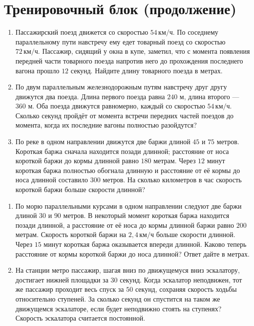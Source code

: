 \documentclass[a4paper,12pt]{article}
\newcommand{\topic}[1]{\par\medskip\noindent{\color{darkaccent}\textbf{#1}}\par\smallskip}
\newcommand{\unit}[1]{\,\text{#1}}
\begin{document}
\section*{Тренировочный блок (продолжение)}
\topic{Уровень выше среднего}
\begin{enumerate}[resume]
\item Пассажирский поезд движется со скоростью $54\unit{км/ч}$. По соседнему параллельному пути навстречу ему едет товарный поезд со скоростью $72\unit{км/ч}$. Пассажир, сидящий у окна в купе, заметил, что с момента появления передней части товарного поезда напротив него до прохождения последнего вагона прошло $12$ секунд. Найдите длину товарного поезда в метрах.
\item По двум параллельным железнодорожным путям навстречу друг другу движутся два поезда. Длина первого поезда равна $240$ м, длина второго --- $360$ м. Оба поезда движутся равномерно, каждый со скоростью $54\unit{км/ч}$. Сколько секунд пройдёт от момента встречи передних частей поездов до момента, когда их последние вагоны полностью разойдутся?
\item По реке в одном направлении движутся две баржи длиной $45$ и $75$ метров. Короткая баржа сначала находится позади длинной; расстояние от носа короткой баржи до кормы длинной равно $180$ метрам. Через $12$ минут короткая баржа полностью обогнала длинную и расстояние от её кормы до носа длинной составило $300$ метров. На сколько километров в час скорость короткой баржи больше скорости длинной?
\end{enumerate}
\topic{Сложный уровень}
\begin{enumerate}[resume]
\item По морю параллельными курсами в одном направлении следуют две баржи длиной $30$ и $90$ метров. В некоторый момент короткая баржа находится позади длинной, а расстояние от её носа до кормы длинной баржи равно $200$ метрам. Скорость короткой баржи на $2,4\unit{км/ч}$ больше скорости длинной. Через $15$ минут короткая баржа оказывается впереди длинной. Каково теперь расстояние от кормы короткой баржи до носа длинной? Ответ дайте в метрах.
\item На станции метро пассажир, шагая вниз по движущемуся вниз эскалатору, достигает нижней площадки за $30$ секунд. Когда эскалатор неподвижен, тот же пассажир проходит весь спуск за $50$ секунд, сохраняя скорость ходьбы относительно ступеней. За сколько секунд он спустится на таком же движущемся эскалаторе, если будет неподвижно стоять на ступенях? Скорость эскалатора считается постоянной.
\end{enumerate}
\end{document}
